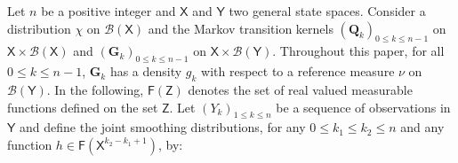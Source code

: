 \documentclass[nolayout]{article}
\newcommand{\eqsp}{\,}
\def\Xset{\mathsf{X}}
\def\Yset{\mathsf{Y}}
\newcommand{\mk}{\kernel{G}}
\newcommand{\hk}{\kernel{Q}}
\newcommand{\md}[1]{g_{#1}}
\newcommand{\kernel}[1]{\mathbf{#1}}
\newcommand{\bmf}[1]{\set{F}(#1)}
\newcommand{\set}[1]{\mathsf{#1}}
\begin{document}
%
%
Let $n$ be a positive integer and $\Xset$ and $\Yset$ two general state spaces. Consider a distribution $\chi$ on $\mathcal{B}(\Xset)$ and the Markov transition kernels $(\hk_{k})_{0\leqslant k \leqslant n-1}$ on $\Xset\times \mathcal{B}(\Xset)$ and $(\mk_{k})_{0\leqslant k \leqslant n-1}$ on $\Xset\times \mathcal{B}(\Yset)$. Throughout this paper, for  all $0\leqslant k \leqslant n-1$, $\mk_{k}$  has a density $\md{k}$ with respect to a reference measure $\nu$ on $\mathcal{B}(\Yset)$. In the following, $\bmf{\mathsf{Z}}$ denotes the set of real valued measurable functions defined on the set $\mathsf{Z}$. Let $(Y_k)_{1\leqslant k\leqslant n}$ be a sequence of observations in $\Yset$ and define the joint smoothing distributions, for any $0 \leqslant k_1 \leqslant k_2 \leqslant n$ and any function $h\in \bmf{\Xset^{k_2 - k_1 +1}}$,  by:
\end{document}
